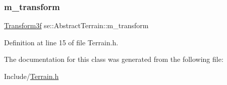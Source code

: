 \subsubsection{\texorpdfstring{m\+\_\+transform}{m\_transform}}
{\footnotesize\ttfamily \mbox{\hyperlink{classse_1_1_transform3f}{Transform3f}} se\+::\+Abstract\+Terrain\+::m\+\_\+transform\hspace{0.3cm}{\ttfamily [protected]}}



Definition at line 15 of file Terrain.\+h.



The documentation for this class was generated from the following file\+:\begin{DoxyCompactItemize}
\item 
Include/\mbox{\hyperlink{_terrain_8h}{Terrain.\+h}}\end{DoxyCompactItemize}
